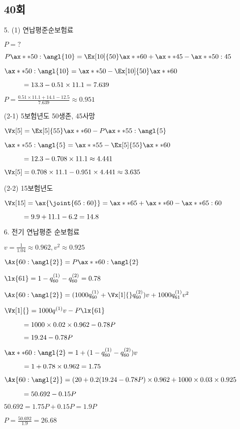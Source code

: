 \documentclass{article}
\newcommand\tab[1][1cm]{\hspace*{#1}}
\begin{document}
\begin{CJK}{UTF8}{mj}


\section*{40회}

5. (1) 연납평준순보험료

$ P = ? ~ $

$ P \ax**{50: \angl{10} } = \Ex[10]{50} \ax**{60} + \ax**{45} -  \ax**{50:45} $

$ \ax**{50: \angl{10}} = \ax**{50} - \Ex[10]{50} \ax**{60} $

$ \tab = 13.3 - 0.51 \times 11.1 = 7.639 $

$ P = \frac{0.51 \times 11.1 + 14.1 - 12.5}{7.639} \approx 0.951 $ 

(2-1) 5보험년도 50생존, 45사망

$ \Vx[5] = \Ex[5]{55} \ax**{60} - P \ax**{55: \angl{5}} $

$ \ax**{55: \angl{5}} = \ax**{55} - \Ex[5]{55} \ax**{60} $ 

$ \tab = 12.3 - 0.708 \times 11.1 \approx 4.441 $ 

$ \Vx[5] = 0.708 \times 11.1 - 0.951 \times 4.441 \approx 3.635 $

(2-2) 15보험년도 

$ \Vx[15] = \ax{\joint{65:60}} = \ax**{65} + \ax**{60} - \ax**{65:60} $ 

$ \tab = 9.9 + 11.1 - 6.2 = 14.8$


6. 전기 연납평준 순보험료

$ v = \frac{1}{1.04} \approx 0.962 , v^2 \approx 0.925 $

$ \Ax{60: \angl{2}} = P \ax**{60: \angl{2}} $

$ \lx{61} = 1 - q^{(1)}_{60} - q^{(2)}_{60} = 0.78 $

$ \Ax{60: \angl{2}} = ( 1000 q^{(1)}_{60} + \Vx[1]{} q^{(2)}_{60} ) v + 1000 q^{(1)}_{61} v^2  $

$ \Vx[1]{} = 1000 q^{(1)} v - P \lx{61} $ 

$ \tab = 1000 \times 0.02 \times 0.962 - 0.78 P $

$ \tab = 19.24 - 0.78 P $

$ \ax**{60: \angl{2}} = 1 + (1 - q^{(1)}_{60} - q^{(2)}_{60}) v $

$ \tab = 1 + 0.78 \times 0.962 = 1.75 $

$ \Ax{60: \angl{2}} = ( 20 + 0.2 (19.24 - 0.78 P ) \times 0.962 + 1000 \times 0.03 \times 0.925 $

$ \tab = 50.692 - 0.15 P $

$ 50.692 = 1.75 P + 0.15 P  = 1.9 P $

$ P = \frac{50.692}{1.9} = 26.68 $


\end{CJK}
\end{document}
